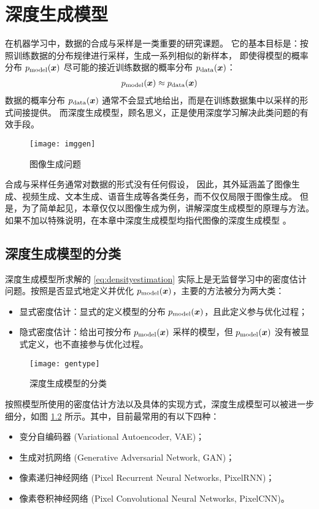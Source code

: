 \chapter{深度生成模型}
\label{cha:gen}

在机器学习中，数据的合成与采样是一类重要的研究课题。
它的基本目标是：按照训练数据的分布规律进行采样，生成一系列相似的新样本，
即使得模型的概率分布 $p_{\mathrm {model}}(\bm x)$ 尽可能的接近训练数据的概率分布 $p_{\mathrm {data}}(\bm x)$：
\begin{align}
	p_{\mathrm {model}}(\bm x) \approx p_{\mathrm {data}}(\bm x) \label{eq:densityestimation}
\end{align}
数据的概率分布 $p_{\mathrm {data}}(\bm x)$ 通常不会显式地给出，而是在训练数据集中以采样的形式间接提供。
而深度生成模型，顾名思义，正是使用深度学习解决此类问题的有效手段。


\begin{figure}[h]
	\centering%
	{\texttt{[image: imggen]}}
	\caption{图像生成问题\cite{gantutorial}}\label{fig:imggen}
\end{figure}

合成与采样任务通常对数据的形式没有任何假设，
因此，其外延涵盖了图像生成、视频生成、文本生成、语音生成等各类任务，而不仅仅局限于图像生成。
但是，为了简单起见，本章仅仅以图像生成为例，讲解深度生成模型的原理与方法。
如果不加以特殊说明，在本章中深度生成模型均指代图像的深度生成模型%
。

\section{深度生成模型的分类}
深度生成模型所求解的 \eqref{eq:densityestimation} 实际上是无监督学习中的密度估计问题。按照是否显式地定义并优化
$p_{\mathrm {model}}(\bm x)$，主要的方法被分为两大类：
\begin{itemize}
	\item 显式密度估计：显式的定义模型的分布 $p_{\mathrm {model}}(\bm x)$，且此定义参与优化过程；
	\item 隐式密度估计：给出可按分布 $p_{\mathrm {model}}(\bm x)$ 采样的模型，但 $p_{\mathrm {model}}(\bm x)$ 没有被显式定义，也不直接参与优化过程。
\end{itemize}
\begin{figure}[h]
	\centering%
	{\texttt{[image: gentype]}}
	\caption{深度生成模型的分类\cite{gantutorial}}\label{fig:gentype}
\end{figure}
按照模型所使用的密度估计方法以及具体的实现方式，深度生成模型可以被进一步细分\cite{gantutorial}，如图 \ref{fig:gentype} 所示。其中，目前最常用的有以下四种：
\begin{itemize}
	\item 变分自编码器\cite{vae} (Variational Autoencoder, VAE)；
	\item 生成对抗网络\cite{gan} (Generative Adversarial Network, GAN)；
	\item 像素递归神经网络\cite{pixelrnn} (Pixel Recurrent Neural Networks, PixelRNN)；
	\item 像素卷积神经网络\cite{pixelcnn} (Pixel Convolutional  Neural Networks, PixelCNN)。
\end{itemize}

